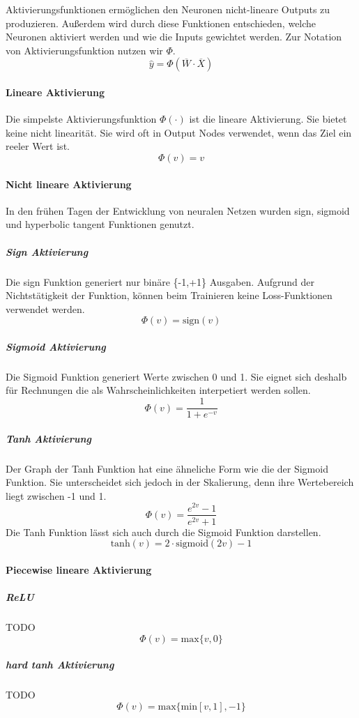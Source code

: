 Aktivierungsfunktionen ermöglichen den Neuronen nicht-lineare Outputs zu produzieren. Außerdem wird durch diese Funktionen entschieden, 
welche Neuronen aktiviert werden und wie die Inputs gewichtet werden. Zur Notation von Aktivierungsfunktion nutzen wir $\Phi$.
$$\hat{y} = \Phi(\overline{W} \cdot \overline{X})$$
\paragraph{Lineare Aktivierung}
Die simpelste Aktivierungsfunktion $\Phi(\cdot)$ ist die lineare Aktivierung. Sie bietet keine nicht linearität. Sie wird oft in Output Nodes
verwendet, wenn das Ziel ein reeler Wert ist.
$$\Phi(v) = v$$
\paragraph{Nicht lineare Aktivierung}
In den frühen Tagen der Entwicklung von neuralen Netzen wurden sign, sigmoid und hyperbolic tangent Funktionen genutzt.
\subparagraph{Sign Aktivierung}
Die sign Funktion generiert nur binäre \{-1,+1\} Ausgaben. Aufgrund der Nichtstätigkeit der Funktion, können beim Trainieren keine Loss-Funktionen verwendet werden.
$$\Phi(v) = \text{sign}(v)$$
\subparagraph{Sigmoid Aktivierung}
Die Sigmoid Funktion generiert Werte zwischen 0 und 1. Sie eignet sich deshalb für Rechnungen die als Wahrscheinlichkeiten interpetiert werden sollen.
$$\Phi(v) = \frac{1}{1 + e^{-v}}$$
\subparagraph{Tanh Aktivierung}
Der Graph der Tanh Funktion hat eine ähneliche Form wie die der Sigmoid Funktion. Sie unterscheidet sich jedoch in der Skalierung, denn ihre Wertebereich liegt zwischen -1 und 1.
$$\Phi(v) = \frac{e^{2v} - 1}{e^{2v} + 1}$$
Die Tanh Funktion lässt sich auch durch die Sigmoid Funktion darstellen.
$$\text{tanh}(v) = 2 \cdot \text{sigmoid}(2v) - 1$$
\paragraph{Piecewise lineare Aktivierung}
\subparagraph{ReLU}
TODO\\
$$\Phi(v) = \text{max}\{v,0\}$$
\subparagraph{hard tanh Aktivierung}
TODO\\
$$\Phi(v) = \text{max}\{\text{min}[v,1],-1\}$$

